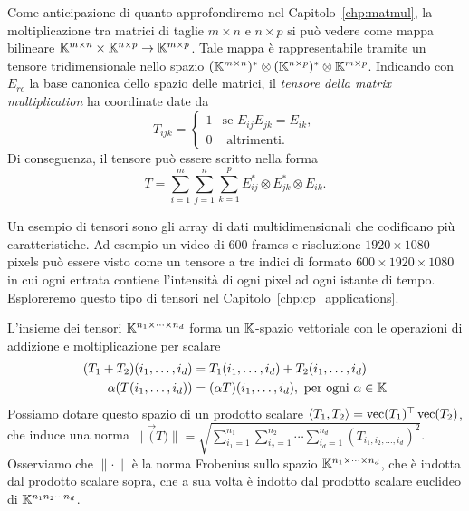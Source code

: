 \begin{example}
	Come anticipazione di quanto approfondiremo nel Capitolo~\ref{chp:matmul}, la moltiplicazione tra
	matrici di taglie $ m \times n
	$ e $ n \times p $ si può vedere come mappa
	bilineare $ \mathbb{K}^{m \times n} \times \mathbb{K}^{n \times p} \to \mathbb{K}^{m \times p} $. Tale mappa è
	rappresentabile tramite
	un tensore tridimensionale nello spazio $(\mathbb{K}^{m\times n})^* \otimes (\mathbb{K}^{n\times p})^* \otimes
		\mathbb{K}^{m \times p} $. Indicando con $ E_{rc} $ la base canonica dello spazio delle matrici, il \emph{tensore della matrix
		multiplication} ha coordinate date da
	\begin{equation*}
		T_{ijk} = \begin{cases}
			1 & \text{se } E_{ij}E_{jk} =E _{ik}, \\
			0 & \text{ altrimenti.}
		\end{cases}
	\end{equation*}
	Di conseguenza, il tensore può essere scritto nella forma
	\begin{equation*}
		T = \sum_{i=1}^m \sum_{j=1}^n \sum_{k = 1}^p E_{ij}^* \otimes E_{jk}^* \otimes E_{ik}.
	\end{equation*}
\end{example}

\begin{example}
	Un esempio di tensori sono gli array di dati multidimensionali che codificano più caratteristiche.
	Ad esempio un video di $ 600 $ frames e risoluzione $ 1920 \times 1080 $ pixels può essere visto
	come un tensore a tre indici di formato $ 600 \times 1920 \times 1080 $ in cui ogni entrata contiene l'intensità di ogni pixel ad ogni
	istante di tempo. Esploreremo questo tipo di tensori nel Capitolo~\ref{chp:cp_applications}.
\end{example}

\begin{remark}
	L'insieme dei tensori $ \K^{\msiz!} $ forma un $ \mathbb{K} $-spazio vettoriale con le operazioni di addizione e moltiplicazione per scalare
	\begin{equation*}
		\begin{aligned}
			(T_1 + T_2)(\miwc!) & = T_1(\miwc!) + T_2(\miwc!)                           \\
			\alpha (T(\miwc!))  & = (\alpha T)(\miwc!), \text{ per ogni } \alpha \in \K
		\end{aligned}
	\end{equation*}
	Possiamo dotare questo spazio di un prodotto scalare $ \angb{T_1, T_2} = \Vec(T_1)^{\top}
		\Vec(T_2)$, che induce una norma $\| \Vec(T)\| = \sqrt{\sum_{i_1=1}^{n_1}\sum_{i_2=1}^{n_2}\cdots
			\sum_{i_{d}=1}^{n_{d}} (T_{i_1,i_2,\ldots,i_{d}})^2 }$.
	Osserviamo che $ \| \cdot \| $ è la norma Frobenius sullo spazio $ \K^{\msiz!} $, che è indotta dal prodotto scalare sopra, che
	a sua volta è indotto dal prodotto scalare euclideo di $ \mathbb{K}^{n_1 n_2 \cdots n_{d}} $.
\end{remark}

